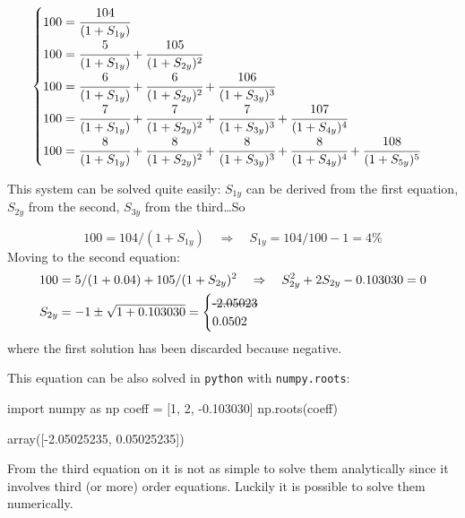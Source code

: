 \begin{equation}
\begin{cases}
100 = \cfrac{104}{(1 + S_{1y})} \\
100 = \cfrac{5}{(1 + S_{1y})} + \cfrac{105}{(1 + S_{2y})^{2}} \\
100 = \cfrac{6} {(1 + S_{1y})} + \cfrac{6}{(1 + S_{2y})^{2}} + \cfrac{106} {(1 + S_{3y})^{3}} \\
100 = \cfrac{7} {(1 + S_{1y})} + \cfrac{7} {(1 + S_{2y})^{2}} + \cfrac{7} {(1 + S_{3y})^{3}} + \cfrac{107} {(1 + S_{4y})^{4}} \\
100 = \cfrac{8} {(1 + S_{1y})} + \cfrac{8} {(1 + S_{2y})^{2}}+ \cfrac{8} {(1 + S_{3y})^{3}} + \cfrac{8} {(1 + S_{4y})^{4}} + \cfrac{108} {(1 + S_{5y})^{5}}
\end{cases}
\label{eq:fifth_year_rate}
\end{equation}

This system can be solved quite easily: $S_{1y}$ can be derived from the first equation, $S_{2y}$ from the second, $S_{3y}$ from the third\ldots So

\begin{equation}
100 = 104 / (1 + S_{1y})\quad\Rightarrow\quad S_{1y} = 104/100 - 1 = 4\%
\end{equation}
Moving to the second equation:
\begin{equation}
\begin{split}
& 100 = 5 / (1 + 0.04) + 105 / (1 + S_{2y})^{2}\quad\Rightarrow\quad S_{2y}^2  + 2 S_{2y}  - 0.103030 = 0 \\
& S_{2y} = - 1 \pm \sqrt{1 + 0.103030} = \begin{cases}\text{\sout{-2.05023}} \\ 0.0502\end{cases}
\end{split}
\end{equation}
where the first solution has been discarded because negative.

This equation can be also solved in \texttt{python} with \texttt{numpy.roots}:
\begin{ipython}
import numpy as np
coeff = [1, 2, -0.103030]
np.roots(coeff)
\end{ipython}
\begin{ioutput}
array([-2.05025235,  0.05025235])
\end{ioutput}

From the third equation on it is not as simple to solve them analytically since it involves third (or more) order equations. Luckily it is possible to solve them numerically.

